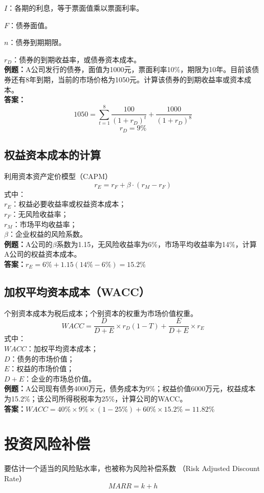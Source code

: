 $I$：各期的利息，等于票面值乘以票面利率。

$F$：债券面值。

$n$：债券到期期限。

$r_D$：债券的到期收益率，或债券资本成本。\\
\textbf{例题：}A公司发行的债券，面值为1000元，票面利率10\%，期限为10年。目前该债券还有8年到期，当前的市场价格为1050元。计算该债券的到期收益率或资本成本。\\
\textbf{答案：}
$$1050=\sum_{t=1}^{8}\frac{100}{(1+r_D)^t}+\frac{1000}{(1+r_D)^8}$$
$$r_D=9\%$$

\subsection{权益资本成本的计算}
利用资本资产定价模型（CAPM）
$$r_E=r_F+\beta \cdot (r_M-r_F)$$
式中：\\
$r_E$：权益必要收益率或权益资本成本；\\
$r_F$：无风险收益率；\\
$r_M$：市场平均收益率；\\
$\beta$：企业权益的风险系数。\\
\textbf{例题：}A公司的$\beta$系数为1.15，无风险收益率为6\%，市场平均收益率为14\%，计算A公司的权益资本成本。\\
\textbf{答案：}$r_E=6\%+1.15(14\%-6\%)=15.2\%$

\subsection{加权平均资本成本（WACC）}
个别资本成本为税后成本；个别资本的权重为市场价值权重。
$$WACC=\frac{D}{D+E} \times r_D(1-T)+\frac{E}{D+E}  \times r_E$$
式中：\\
$WACC$：加权平均资本成本；\\
$D$：债务的市场价值；\\
$E$：权益的市场价值；\\
$D+E$：企业的市场总价值。\\
\textbf{例题：}A公司现有债务4000万元，债务成本为9\%；权益价值6000万元，权益成本为15.2\%；该公司所得税税率为25\%，计算公司的WACC。\\
\textbf{答案：}$WACC=40\% \times 9\% \times (1-25\%) +60\% \times 15.2\%=11.82\%$

\section{投资风险补偿}
要估计一个适当的风险贴水率，也被称为风险补偿系数 （Risk Adjusted Discount Rate）
$$MARR=k+h$$

